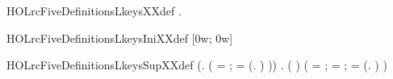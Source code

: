 \newcommand{\HOLrcFiveDefinitionslenWinbytXXdef}{\UseVerbatim{HOLrcFiveDefinitionslenWinbytXXdef}}
\begin{SaveVerbatim}{HOLrcFiveDefinitionsLkeysXXdef}
\HOLTokenTurnstile{} \HOLSymConst{\HOLTokenForall{}}.   \HOLSymConst{=}   
\end{SaveVerbatim}
\newcommand{\HOLrcFiveDefinitionsLkeysXXdef}{\UseVerbatim{HOLrcFiveDefinitionsLkeysXXdef}}
\begin{SaveVerbatim}{HOLrcFiveDefinitionsLkeysIniXXdef}
\HOLTokenTurnstile{}  \HOLSymConst{=} [0w; 0w]
\end{SaveVerbatim}
\newcommand{\HOLrcFiveDefinitionsLkeysIniXXdef}{\UseVerbatim{HOLrcFiveDefinitionsLkeysIniXXdef}}
\begin{SaveVerbatim}{HOLrcFiveDefinitionsLkeysSupXXdef}
\HOLTokenTurnstile{} (\HOLSymConst{\HOLTokenForall{}}.    \HOLSymConst{=}
        (
            = ;
            =  
             (\HOLTokenLambda{}.
                    \HOLSymConst{=}        \HOLSymConst{\HOLTokenRol{}}  \HOLSymConst{\ensuremath{+}}   
                     ) )) \HOLSymConst{\HOLTokenConj{}}
   \HOLSymConst{\HOLTokenForall{}} .
       ( ) \HOLSymConst{=}
     (
         =   ;
         =  ;
         =  \HOLSymConst{\ensuremath{-}}  
          (\HOLTokenLambda{}.
                 \HOLSymConst{=}        \HOLSymConst{\HOLTokenRol{}}  \HOLSymConst{\ensuremath{+}}   
                  ) )
\end{SaveVerbatim}
